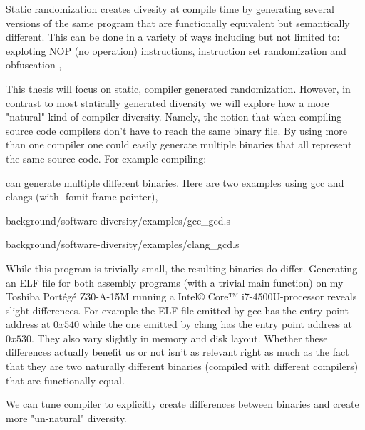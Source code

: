 Static randomization creates divesity at compile time by generating several versions of the
same program that are functionally equivalent but semantically different. This can be done
in a variety of ways including but not limited to: exploting NOP (no operation) instructions,
instruction set randomization and obfuscation \cite[Section~4.1.1]{survey},

This thesis will focus on static, compiler generated randomization. However, in contrast
to most statically generated diversity we will explore how a more "natural" kind of compiler
diversity. Namely, the notion that when compiling source code compilers don't have to reach
the same binary file. By using more than one compiler one could easily generate multiple
binaries that all represent the same source code. For example compiling:



can generate multiple different binaries. Here are two examples using gcc and clangs (with
-fomit-frame-pointer),


{background/software-diversity/examples/gcc_gcd.s}


{background/software-diversity/examples/clang_gcd.s}

While this program is trivially small, the resulting binaries do differ. Generating an
ELF file for both assembly programs (with a trivial main function) on my Toshiba Portégé
Z30-A-15M running a Intel® Core™ i7-4500U-processor reveals slight differences. For example
the ELF file emitted by gcc has the entry point address at $0x540$ while the one emitted
by clang has the entry point address at $0x530$. They also vary slightly in memory and
disk layout. Whether these differences actually benefit us or not isn't as relevant right
as much as the fact that they are two naturally different binaries (compiled with different
compilers) that are functionally equal.

We can tune compiler to explicitly create differences between binaries and create more
"un-natural" diversity. 

